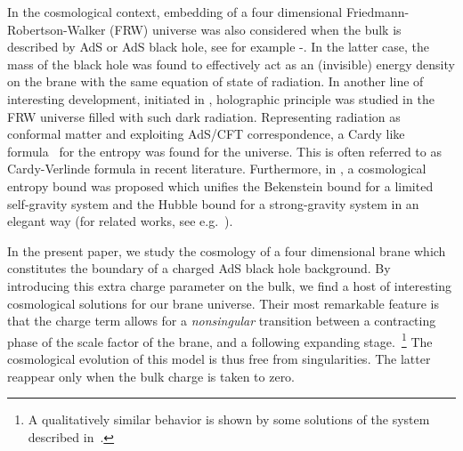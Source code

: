 \documentclass[a4paper,11pt]{article}
\begin{document}
In the cosmological context, embedding of a four dimensional 
Friedmann-Robertson-Walker (FRW) universe was also considered when the
bulk is described by AdS or AdS black hole, see for example
\cite{TN}-\cite{NOO}. In the latter case, the mass of the black hole was
found to effectively act as an (invisible) energy density on the brane
with the same equation of state of radiation. In another line of
interesting development, initiated in \cite{EV,SV}, holographic principle
was studied in the FRW universe filled with such dark radiation.
Representing radiation as conformal matter and exploiting AdS/CFT
correspondence, a Cardy like formula~\cite{CARDY} for the entropy was
found for the universe. This is often referred to as Cardy-Verlinde
formula in recent literature. Furthermore, in \cite{EV}, a cosmological
entropy bound was proposed which unifies the Bekenstein bound for a
limited self-gravity system and the Hubble bound for a strong-gravity
system in an elegant way (for related works, see e.g.~\cite{NO,CMO,AP}).

In the present paper, we study the cosmology of a four  dimensional brane 
which constitutes the boundary of a charged AdS black hole background. By
introducing this extra charge parameter on the bulk, we find a host of 
interesting cosmological solutions for our brane universe. Their most
remarkable feature is that the charge term allows  for a {\it nonsingular}
transition between a contracting phase of the scale  factor of the brane,
and a following expanding stage.~\footnote{A qualitatively similar
behavior is shown by some solutions of the system described
in~\cite{BCG}.} The cosmological evolution of this model is thus free from
singularities. The latter reappear only when the bulk charge is taken to
zero. 
\end{document}
